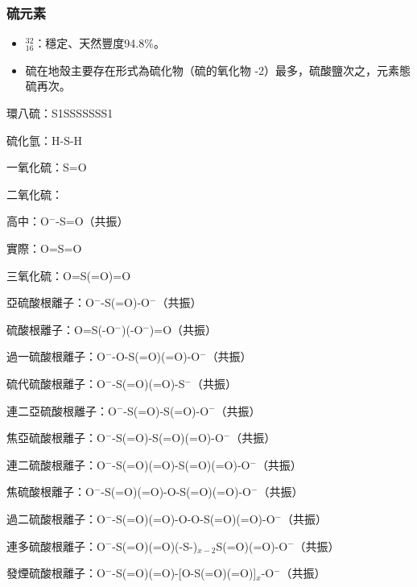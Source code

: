 \documentclass[a4paper,12pt]{report}
\begin{document}
\subsubsection{硫元素}
\begin{itemize}
\item $^{32}_ {16}$\rmS：穩定、天然豐度94.8\%。
\item 硫在地殼主要存在形式為硫化物（硫的氧化物 -2）最多，硫酸鹽次之，元素態硫再次。
\end{itemize}
\bit
\item 環八硫：S1SSSSSSS1
\item 硫化氫：H-S-H
\item 一氧化硫：S=O
\item 二氧化硫：
\bit
\item 高中：O$^-$-S=O（共振）
\item 實際：O=S=O
\eit
\item 三氧化硫：O=S(=O)=O
\item 亞硫酸根離子：O$^-$-S(=O)-O$^-$（共振）
\item 硫酸根離子：O=S(-O$^-$)(-O$^-$)=O（共振）
\item 過一硫酸根離子：O$^-$-O-S(=O)(=O)-O$^-$（共振）
\item 硫代硫酸根離子：O$^-$-S(=O)(=O)-S$^-$（共振）
\item 連二亞硫酸根離子：O$^-$-S(=O)-S(=O)-O$^-$（共振）
\item 焦亞硫酸根離子：O$^-$-S(=O)-S(=O)(=O)-O$^-$（共振）
\item 連二硫酸根離子：O$^-$-S(=O)(=O)-S(=O)(=O)-O$^-$（共振）
\item 焦硫酸根離子：O$^-$-S(=O)(=O)-O-S(=O)(=O)-O$^-$（共振）
\item 過二硫酸根離子：O$^-$-S(=O)(=O)-O-O-S(=O)(=O)-O$^-$（共振）
\item 連多硫酸根離子：O$^-$-S(=O)(=O)(-S-)$_{x-2}$S(=O)(=O)-O$^-$（共振）
\item 發煙硫酸根離子：O$^-$-S(=O)(=O)-[O-S(=O)(=O)]$_x$-O$^-$（共振）
\eit
\end{document}
